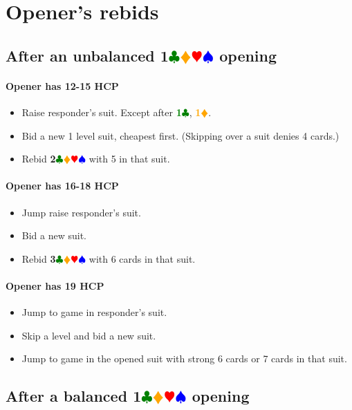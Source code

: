 \documentclass{article}
\newcommand{\Hs}{\textcolor{Red}{$\varheart$}}
\newcommand{\Ss}{\textcolor{Blue}{$\spadesuit$}}
\newcommand{\Ds}{\textcolor{Orange}{$\vardiamond$}}
\newcommand{\Cs}{\textcolor{Green}{$\clubsuit$}}
\newcommand{\D}[1]{\textcolor{Orange}{\textbf{#1}\Ds}}
\newcommand{\C}[1]{\textcolor{Green}{\textbf{#1}\Cs}}
\newcommand{\suits}[1]{\textbf{#1}\Cs\Ds\Hs\Ss}
\begin{document}
\section{Opener's rebids}

\subsection{After an unbalanced \suits{1} opening}

\paragraph{Opener has 12-15 HCP}

\begin{itemize}
\item Raise responder's suit. Except after \C{1}, \D{1}.
\item Bid a new 1 level suit, cheapest first. (Skipping over a suit denies 4 cards.)
\item Rebid \suits{2} with 5 in that suit.
\end{itemize}

\paragraph{Opener has 16-18 HCP}

\begin{itemize}
\item Jump raise responder's suit.
\item Bid a new suit.
\item Rebid \suits{3} with 6 cards in that suit.
\end{itemize}

\paragraph{Opener has 19 HCP}

\begin{itemize}
\item Jump to game in responder's suit.
\item Skip a level and bid a new suit.
\item Jump to game in the opened suit with strong 6 cards or 7 cards in that suit.
\end{itemize}

\subsection{After a balanced \suits{1} opening}
\end{document}
